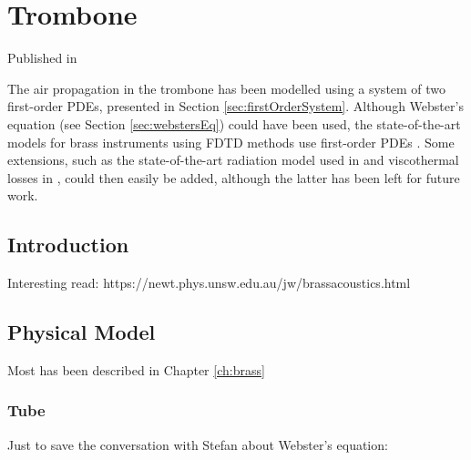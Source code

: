 \chapter{Trombone}\label{ch:trombone}
Published in \citeP[H]

The air propagation in the trombone has been modelled using a system of two first-order PDEs, presented in Section \ref{sec:firstOrderSystem}. Although Webster's equation (see Section \ref{sec:webstersEq}) could have been used, the state-of-the-art models for brass instruments using FDTD methods use first-order PDEs \cite{Bilbao2016, Harrison2018}. Some extensions, such as the state-of-the-art radiation model used in \cite{Harrison2018} and viscothermal losses in \cite{Bilbao2016}, could then easily be added, although the latter has been left for future work.  


\section{Introduction}
Interesting read: https://newt.phys.unsw.edu.au/jw/brassacoustics.html
\section{Physical Model}
Most has been described in Chapter \ref{ch:brass}

\subsection{Tube}
Just to save the conversation with Stefan about Webster's equation:

